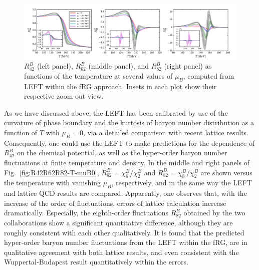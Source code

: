 \documentclass[%
reprint,
superscriptaddress,
showpacs,preprintnumbers,
 amsmath,amssymb,
 aps,
prd,
]{revtex4-1}
\def\Fig#1{Fig.~\ref{#1}} \def\Tab#1{Tab.~\ref{#1}}
\begin{document}
%
\begin{figure}[t]
\includegraphics[width=1.\textwidth]{R42R62R82-T-muB0to400}
\caption{$R^{B}_{42}$ (left panel), $R^{B}_{62}$ (middle panel), and $R^{B}_{82}$ (right panel) as functions of the temperature at several values of $\mu_B$, computed from LEFT within the fRG approach. Insets in each plot show their respective zoom-out view.}\label{fig:R42R62R82-T-muB0to400}
\end{figure}
%



As we have discussed above, the LEFT has been calibrated by use of the curvature of phase boundary and the kurtosis of baryon number distribution as a function of $T$ with $\mu_B=0$, via a detailed comparison with recent lattice results. Consequently, one could use the LEFT to make predictions for the dependence of $R^{B}_{42}$ on the chemical potential, as well as the hyper-order baryon number fluctuations at finite temperature and density. In the middle and right panels of \Fig{fig:R42R62R82-T-muB0}, $R^{B}_{62}=\chi^{B}_{6}/\chi^{B}_{2}$ and $R^{B}_{82}=\chi^{B}_{8}/\chi^{B}_{2}$ are shown versus the temperature with vanishing $\mu_B$, respectively, and in the same way the LEFT and lattice QCD results are compared. Apparently, one observes that, with the increase of the order of fluctuations, errors of lattice calculation increase dramatically. Especially, the eighth-order fluctuations $R^{B}_{82}$ obtained by the two collaborations show a significant quantitative difference, although they are roughly consistent with each other qualitatively. It is found that the predicted hyper-order baryon number fluctuations from the LEFT within the fRG, are in qualitative agreement with both lattice results, and even consistent with the Wuppertal-Budapest result quantitatively within the errors.
\end{document}
